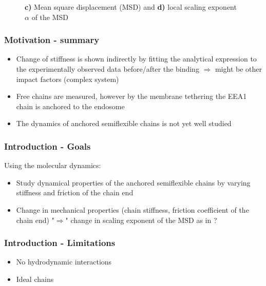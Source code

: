 \documentclass[handout]{beamer}
\begin{document}
\begin{frame}
\begin{figure}[h]
\begin{subfigure}[b]{0.49\textwidth}
        \end{subfigure}
        \caption{
            \textbf{c)} Mean square displacement (MSD) and \textbf{d)}
            local scaling exponent $\alpha$ of the MSD \cite{Singh:2022}
        }
    \end{figure}

\end{frame}


\begin{frame}
    \frametitle{Motivation - summary}
    \begin{itemize}
        \item Change of stiffness is shown indirectly by fitting the 
        analytical expression to the experimentally observed data before/after
        the binding $\Rightarrow$ might be other impact factors (complex system)
        \item Free chains are measured, however by the membrane tethering the EEA1 
        chain is anchored to the endosome
        \item The dynamics of anchored semiflexible chains is not yet well studied 
    \end{itemize} 
\end{frame}


\begin{frame}
    \frametitle{Introduction - Goals}

    Using the molecular dynamics:
    \vspace{0.5cm}
    \begin{itemize}
        \item Study dynamical properties of the anchored
        semiflexible chains by varying stiffness and friction of the chain end
        \item Change in mechanical properties (chain stiffness, friction coefficient of the chain end)
        "$\Rightarrow$" change in scaling exponent of the MSD as in \cite{Singh:2022}? 
    \end{itemize}

\end{frame}


\begin{frame}
    \frametitle{Introduction - Limitations}

    \begin{itemize}
        \item No hydrodynamic interactions
        \item Ideal chains
    \end{itemize}

\end{frame}
\end{document}
